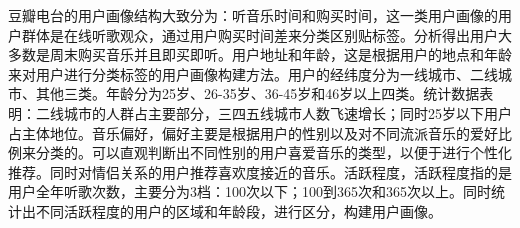 		豆瓣电台的用户画像结构大致分为：听音乐时间和购买时间，这一类用户画像的用户群体是在线听歌观众，通过用户购买时间差来分类区别贴标签。分析得出用户大多数是周末购买音乐并且即买即听。用户地址和年龄，这是根据用户的地点和年龄来对用户进行分类标签的用户画像构建方法。用户的经纬度分为一线城市、二线城市、其他三类。年龄分为25岁、26-35岁、36-45岁和46岁以上四类。统计数据表明：二线城市的人群占主要部分，三四五线城市人数飞速增长；同时25岁以下用户占主体地位。音乐偏好，偏好主要是根据用户的性别以及对不同流派音乐的爱好比例来分类的。可以直观判断出不同性别的用户喜爱音乐的类型，以便于进行个性化推荐。同时对情侣关系的用户推荐喜欢度接近的音乐。活跃程度，活跃程度指的是用户全年听歌次数，主要分为3档：100次以下；100到365次和365次以上。同时统计出不同活跃程度的用户的区域和年龄段，进行区分，构建用户画像。
		\begin{figure}
	    \centering
	      \label{pic:recmd_doubanFM}
	    \end{figure}


